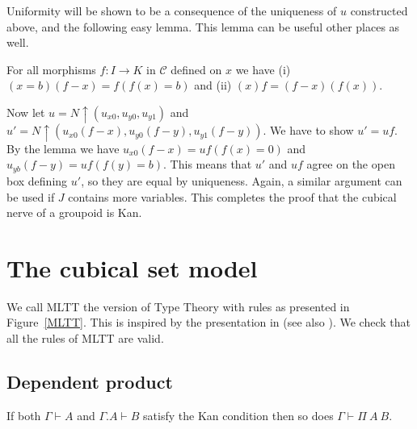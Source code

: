 \documentclass[10pt,a4paper]{article}
\newcommand{\CC}{{\mathcal C}}
\newcommand{\rup}[1]{#1{\uparrow}}
\begin{document}
Uniformity will be shown to be a consequence of the uniqueness of
$u$ constructed above, and the following easy lemma.
This lemma can be useful other places as well.
\begin{lemma}  For all morphisms $f:I\to K$ in $\CC$ defined on $x$ we have
(i) $(x=b)(f-x) = f (f(x)=b)$ and (ii) $(x)f = (f-x)(f(x))$.
\end{lemma}
Now let $u=\rup{N}(u_{x0},u_{y0},u_{y1})$ and
$u'=\rup{N}(u_{x0}(f-x),u_{y0}(f-y),u_{y1}(f-y))$.
We have to show $u'=uf$.
By the lemma we have $u_{x0}(f-x) = uf(f(x)=0)$ and $u_{yb}(f-y) = uf(f(y)=b)$.
This means that $u'$ and $uf$ agree on the open box defining $u'$,
so they are equal by uniqueness.
Again, a similar argument can be used if $J$ contains more variables.
This completes the proof that the cubical nerve of a groupoid is Kan.

\section{The cubical set model}\label{cubsetmodel}

We call MLTT the version of Type Theory with rules as presented in Figure~\ref{MLTT}.
This is inspired by the presentation in \cite{Curien} (see also \cite{Dybjer}).
We check that all the rules of MLTT are valid.

\subsection{Dependent product}

\begin{theorem}
If both $\Gamma\vdash A$ and $\Gamma.A\vdash B$ satisfy the Kan condition then so does $\Gamma\vdash\Pi~A~B$.
\end{theorem}
\end{document}
